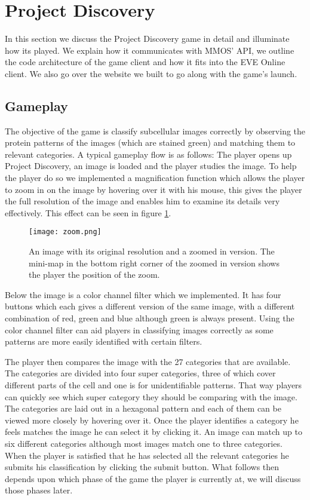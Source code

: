 \section{Project Discovery}\label{sec:projectdiscovery}
	In this section we discuss the Project Discovery game in detail and illuminate how its played. We explain how it communicates with MMOS' API, we outline the code architecture of the game client and how it fits into the EVE Online client. We also go over the website we built to go along with the game's launch.

\subsection{Gameplay}
	The objective of the game is classify subcellular images correctly by observing the protein patterns of the images (which are stained green) and matching them to relevant categories. A typical gameplay flow is as follows: The player opens up Project Discovery, an image is loaded and the player studies the image. To help the player do so we implemented a magnification function which allows the player to zoom in on the image by hovering over it with his mouse, this gives the player the full resolution of the image and enables him to examine its details very effectively. This effect can be seen in figure \ref{fig:zoom}.

	\begin{figure}[H]
	  \centering
	  \graphicspath{ {./graphics/} }
	  \centerline{\texttt{[image: zoom.png]}}
	  \caption{\label{fig:zoom}An image with its original resolution and a zoomed in version. The mini-map in the bottom right corner of the zoomed in version shows the player the position of the zoom.}
	\end{figure}

	Below the image is a color channel filter which we implemented. It has four buttons which each gives a different version of the same image, with a different combination of red, green and blue although green is always present. Using the color channel filter can aid players in classifying images correctly as some patterns are more easily identified with certain filters.

	The player then compares the image with the 27 categories that are available. The categories are divided into four super categories, three of which cover different parts of the cell and one is for unidentifiable patterns. That way players can quickly see which super category they should be comparing with the image. The categories are laid out in a hexagonal pattern and each of them can be viewed more closely by hovering over it. Once the player identifies a category he feels matches the image he can select it by clicking it. An image can match up to six different categories although most images match one to three categories. When the player is satisfied that he has selected all the relevant categories he submits his classification by clicking the submit button. What follows then depends upon which phase of the game the player is currently at, we will discuss those phases later.

